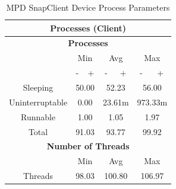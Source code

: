 \documentclass[11pt,a4paper]{scrreprt}
\begin{document}
\begin{table}[H]
\centering
    \begin{tabular}{||c|c|c|c|c|c|c||}
    \hline
    \multicolumn{7}{|c|}{\textbf{Processes (Client)}} \\
    \hline
    \multicolumn{7}{|c|}{\textbf{Processes}} \\
    \hline\hline
      & \multicolumn{2}{|c|}{Min} & \multicolumn{2}{|c|}{Avg} & \multicolumn{2}{|c|}{Max} \\
    \hline
      & - & + & - & + & - & + \\
    \hline
    Sleeping & \multicolumn{2}{|c|}{50.00} & \multicolumn{2}{|c|}{52.23} & \multicolumn{2}{|c|}{56.00} \\
    \hline
    Uninterruptable & \multicolumn{2}{|c|}{0.00} & \multicolumn{2}{|c|}{23.61m} & \multicolumn{2}{|c|}{973.33m} \\
    \hline
    Runnable & \multicolumn{2}{|c|}{1.00} & \multicolumn{2}{|c|}{1.05} & \multicolumn{2}{|c|}{1.97} \\
    \hline
    Total & \multicolumn{2}{|c|}{91.03} & \multicolumn{2}{|c|}{93.77} & \multicolumn{2}{|c|}{99.92} \\
    \hline\hline
    \multicolumn{7}{|c|}{\textbf{Number of Threads}} \\
    \hline\hline
      & \multicolumn{2}{|c|}{Min} & \multicolumn{2}{|c|}{Avg} & \multicolumn{2}{|c|}{Max} \\
    \hline
    Threads  & \multicolumn{2}{|c|}{98.03} & \multicolumn{2}{|c|}{100.80} & \multicolumn{2}{|c|}{106.97} \\
    \hline\hline
    \end{tabular}
    \caption{MPD SnapClient Device Process Parameters}
    \label{MPDclientProcessTab}
\end{table}
\end{document}
